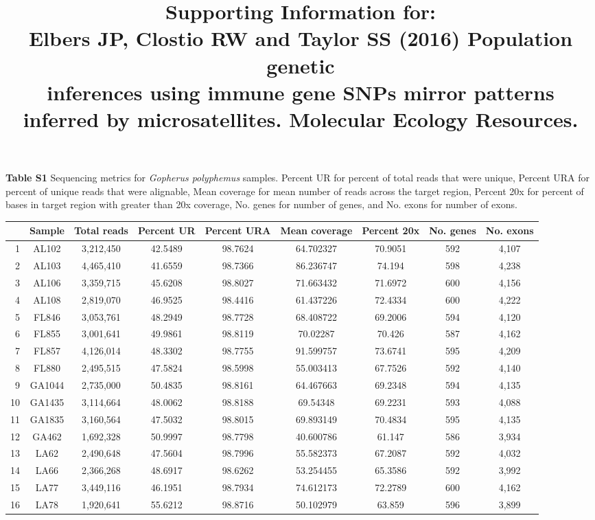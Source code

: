 \documentclass[english]{article}\usepackage[]{graphicx}\usepackage[]{color}
\title{Supporting Information for: \\
Elbers JP, Clostio RW and Taylor SS (2016) Population genetic \\
inferences using immune gene SNPs mirror patterns \\
inferred by microsatellites. Molecular Ecology Resources.}
\date{}
\author{}
\begin{document}
\maketitle



\noindent
\textbf{Table S1} Sequencing metrics for \textit{Gopherus polyphemus} samples. Percent UR for percent of total reads that were unique, Percent URA for percent of unique reads that were alignable, Mean coverage for mean number of reads across the target region, Percent 20x for percent of bases in target region with greater than 20x coverage, No. genes for number of genes, and No. exons for number of exons.\\
\begin{table}[ht]
\centering
\begin{tabular}{rcccccccc}
  \hline
 & Sample & Total reads & Percent UR & Percent URA & Mean coverage & Percent 20x & No. genes & No. exons \\ 
  \hline
1 & AL102 & 3,212,450 & 42.5489 & 98.7624 & 64.702327 & 70.9051 & 592 & 4,107 \\ 
  2 & AL103 & 4,465,410 & 41.6559 & 98.7366 & 86.236747 & 74.194 & 598 & 4,238 \\ 
  3 & AL106 & 3,359,715 & 45.6208 & 98.8027 & 71.663432 & 71.6972 & 600 & 4,156 \\ 
  4 & AL108 & 2,819,070 & 46.9525 & 98.4416 & 61.437226 & 72.4334 & 600 & 4,222 \\ 
  5 & FL846 & 3,053,761 & 48.2949 & 98.7728 & 68.408722 & 69.2006 & 594 & 4,120 \\ 
  6 & FL855 & 3,001,641 & 49.9861 & 98.8119 & 70.02287 & 70.426 & 587 & 4,162 \\ 
  7 & FL857 & 4,126,014 & 48.3302 & 98.7755 & 91.599757 & 73.6741 & 595 & 4,209 \\ 
  8 & FL880 & 2,495,515 & 47.5824 & 98.5998 & 55.003413 & 67.7526 & 592 & 4,140 \\ 
  9 & GA1044 & 2,735,000 & 50.4835 & 98.8161 & 64.467663 & 69.2348 & 594 & 4,135 \\ 
  10 & GA1435 & 3,114,664 & 48.0062 & 98.8188 & 69.54348 & 69.2231 & 593 & 4,088 \\ 
  11 & GA1835 & 3,160,564 & 47.5032 & 98.8015 & 69.893149 & 70.4834 & 595 & 4,135 \\ 
  12 & GA462 & 1,692,328 & 50.9997 & 98.7798 & 40.600786 & 61.147 & 586 & 3,934 \\ 
  13 & LA62 & 2,490,648 & 47.5604 & 98.7996 & 55.582373 & 67.2087 & 592 & 4,032 \\ 
  14 & LA66 & 2,366,268 & 48.6917 & 98.6262 & 53.254455 & 65.3586 & 592 & 3,992 \\ 
  15 & LA77 & 3,449,116 & 46.1951 & 98.7934 & 74.612173 & 72.2789 & 600 & 4,162 \\ 
  16 & LA78 & 1,920,641 & 55.6212 & 98.8716 & 50.102979 & 63.859 & 596 & 3,899 \\ 
   \hline
\end{tabular}
\end{table}
\end{document}
